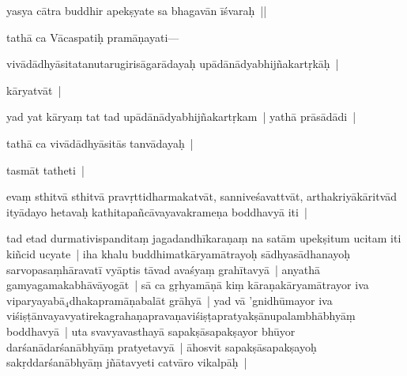 \documentclass[article,12pt,a4paper]{memoir}%
\newcounter{parCount}
\begin{document}
	  
	  \pstart \leavevmode%
	yasya cātra buddhir apekṣyate sa bhagavān īśvaraḥ ||
	{}
	\pend%
      

	  
	  \pstart \leavevmode%
	tathā ca Vācaspatiḥ pramāṇayati—
	{}
	\pend%
      

	  
	  \pstart \leavevmode%
	vivādādhyāsitatanutarugirisāgarādayaḥ upādānādyabhijñakartṛkāḥ |
	{}
	\pend%
      

	  
	  \pstart \leavevmode%
	kāryatvāt |
	{}
	\pend%
      

	  
	  \pstart \leavevmode%
	yad yat kāryaṃ tat tad upādānādyabhijñakartṛkam | yathā prāsādādi |
	{}
	\pend%
      

	  
	  \pstart \leavevmode%
	tathā ca vivādādhyāsitās tanvādayaḥ |
	{}
	\pend%
      

	  
	  \pstart \leavevmode%
	tasmāt tatheti |
	{}
	\pend%
      

	  
	  \pstart \leavevmode%
	evaṃ sthitvā sthitvā pravṛttidharmakatvāt, sanniveśavattvāt, arthakriyākāritvād ityādayo hetavaḥ kathitapañcāvayavakrameṇa boddhavyā iti |
	{}
	\pend%
      \label{īsd-uttarapakṣa}
	  
	\label{īsd-vyāptigrahaṇa}
	  
	

	  
	  \pstart \leavevmode%
	\label{thakur75-40.16}tad etad durmativispanditaṃ jagadandhīkaraṇaṃ na satām upekṣitum ucitam iti kiñcid ucyate | iha khalu buddhimatkāryamātrayoḥ sādhyasādhanayoḥ sarvopasaṃhāravatī vyāptis tāvad avaśyaṃ grahītavyā | anyathā gamyagamakabhāvāyogāt | sā ca gṛhyamāṇā kiṃ kāraṇakāryamātrayor iva viparyayabā{\tiny $_{4}$}dhakapramāṇabalāt grāhyā | yad vā 'gnidhūmayor iva viśiṣṭānvayavyatirekagrahaṇapravaṇaviśiṣṭapratyakṣānupalambhābhyāṃ boddhavyā | uta svavyavasthayā sapakṣāsapakṣayor bhūyor darśanādarśanābhyāṃ pratyetavyā | āhosvit sapakṣāsapakṣayoḥ sakṛddarśanābhyāṃ jñātavyeti catvāro vikalpāḥ |
	{}
	\pend%
      
\end{document}
